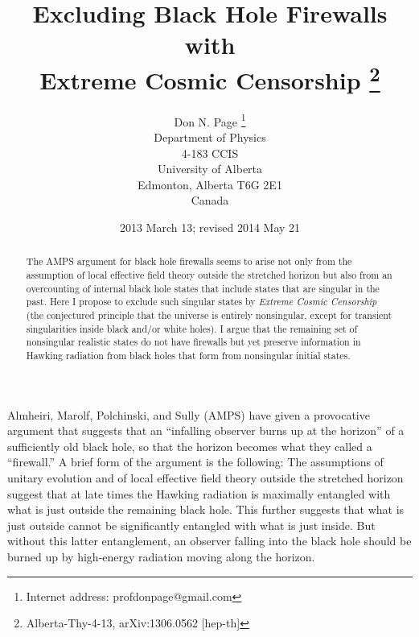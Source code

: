 \documentclass[12pt]{article}
\begin{document}
\title{{\bf Excluding Black Hole Firewalls\\ with\\ Extreme Cosmic Censorship}
\thanks{Alberta-Thy-4-13, arXiv:1306.0562 [hep-th]}}

\author{
Don N. Page
\thanks{Internet address:
profdonpage@gmail.com}
\\
Department of Physics\\
4-183 CCIS\\
University of Alberta\\
Edmonton, Alberta T6G 2E1\\
Canada
}

\date{2013 March 13; revised 2014 May 21}

\maketitle
\large
\begin{abstract}

The AMPS argument for black hole firewalls seems to arise not only from the assumption of local effective field theory outside the stretched horizon but also from an overcounting of internal black hole states that include states that are singular in the past.  Here I propose to exclude such singular states by {\it Extreme Cosmic Censorship} (the conjectured principle that the universe is entirely nonsingular, except for transient singularities inside black and/or white holes).  I argue that the remaining set of nonsingular realistic states do not have firewalls but yet preserve information in Hawking radiation from black holes that form from nonsingular initial states.

\end{abstract}

\normalsize

\newpage


Almheiri, Marolf, Polchinski, and Sully (AMPS) \cite{AMPS} have given a provocative argument that suggests that an ``infalling observer burns up at the horizon'' of a sufficiently old black hole, so that the horizon becomes what they called a ``firewall.''  A brief form of the argument is the following:  The assumptions of unitary evolution and of local effective field theory outside the stretched horizon suggest that at late times the Hawking radiation is maximally entangled with what is just outside the remaining black hole.  This further suggests that what is just outside cannot be significantly entangled with what is just inside.  But without this latter entanglement, an observer falling into the black hole should be burned up by high-energy radiation moving along the horizon.
\end{document}
